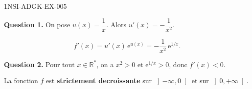 \begin{corrige}{1NSI-ADGK-EX-005}

\textbf{Question 1.} On pose $u(x) = \dfrac{1}{x}$. Alors $u'(x) = -\dfrac{1}{x^2}$.

\[ f'(x) = u'(x)\,\mathrm{e}^{u(x)} = -\frac{1}{x^2}\,\mathrm{e}^{1/x}. \]


\textbf{Question 2.} Pour tout $x \in \mathbb{R}^*$, on a $x^2 > 0$ et $\mathrm{e}^{1/x} > 0$, donc $f'(x) < 0$.

La fonction $f$ est \textbf{strictement decroissante} sur $\left]-\infty, 0\right[$ et sur $\left]0, +\infty\right[$.

\end{corrige}

